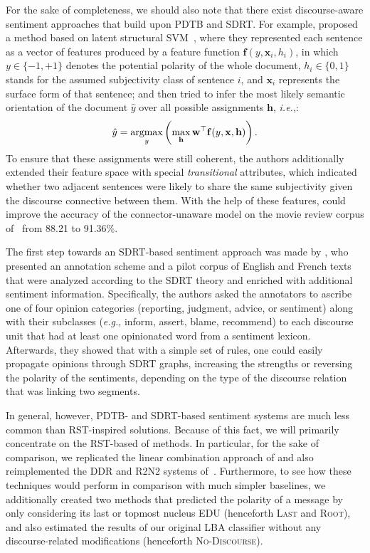 \documentclass[11pt]{article}
\newcommand{\argmax}{\operatornamewithlimits{argmax}}
\newcommand{\eg}{\textit{e.g.},}
\newcommand{\ienocomma}{\textit{i.e.}}
\newcommand{\ie}{\ienocomma,}
\begin{document}
For the sake of completeness, we should also note that there exist
discourse-aware sentiment approaches that build upon PDTB and SDRT\@.
For example,  proposed a method based on latent
structural SVM~\cite{Yu:09}, where they represented each sentence as a
vector of features produced by a feature function $\mathbf{f}(y,
\mathbf{x}_i, h_i)$, in which $y\in\{-1, +1\}$ denotes the potential
polarity of the whole document, $h_i \in \{0, 1\}$ stands for the
assumed subjectivity class of sentence $i$, and $\mathbf{x}_i$
represents the surface form of that sentence; and then tried to infer
the most likely semantic orientation of the document $\hat{y}$ over
all possible assignments $\mathbf{h}$, \ie{}:
\begin{equation*}
  \hat{y} =
  \argmax_y\left(\max_{\mathbf{h}}\mathbf{w}^{\top}\mathbf{f}(y,
  \mathbf{x}, \mathbf{h})\right).
\end{equation*}
To ensure that these assignments were still coherent, the authors
additionally extended their feature space with special
\emph{transitional} attributes, which indicated whether two adjacent
sentences were likely to share the same subjectivity given the
discourse connective between them.  With the help of these features,
 could improve the accuracy of the
connector-unaware model on the movie review corpus of~
from 88.21 to 91.36\%.

The first step towards an SDRT-based sentiment approach was made by
, who presented an annotation scheme and a pilot
corpus of English and French texts that were analyzed according to the
SDRT theory and enriched with additional sentiment information.
Specifically, the authors asked the annotators to ascribe one of four
opinion categories (reporting, judgment, advice, or sentiment) along
with their subclasses (\eg{} inform, assert, blame, recommend) to each
discourse unit that had at least one opinionated word from a sentiment
lexicon.  Afterwards, they showed that with a simple set of rules, one
could easily propagate opinions through SDRT graphs, increasing the
strengths or reversing the polarity of the sentiments, depending on
the type of the discourse relation that was linking two segments.

In general, however, PDTB- and SDRT-based sentiment systems are much
less common than RST-inspired solutions.  Because of this fact, we
will primarily concentrate on the RST-based of methods.  In
particular, for the sake of comparison, we replicated the linear
combination approach of  and also reimplemented the
DDR and R2N2 systems of~.  Furthermore, to see how
these techniques would perform in comparison with much simpler
baselines, we additionally created two methods that predicted the
polarity of a message by only considering its last or topmost nucleus
EDU (henceforth \textsc{Last} and \textsc{Root}), and also estimated
the results of our original LBA classifier without any
discourse-related modifications (henceforth \textsc{No-Discourse}).
\end{document}
